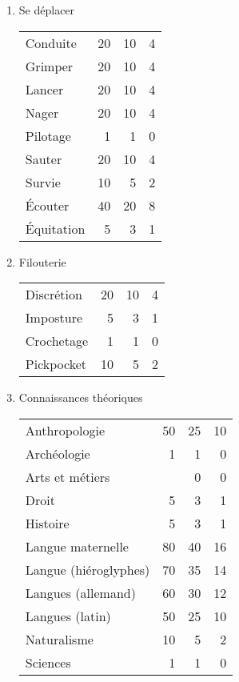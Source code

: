 \documentclass[11pt]{article}
\begin{document}
\begin{twocols}
\begin{enumerate}
\item Se déplacer
\label{sec:org9268a06}

\begin{center}
\begin{tabular}{lrrr}
Conduite & 20 & 10 & 4\\
Grimper & 20 & 10 & 4\\
Lancer & 20 & 10 & 4\\
Nager & 20 & 10 & 4\\
Pilotage & 1 & 1 & 0\\
Sauter & 20 & 10 & 4\\
Survie & 10 & 5 & 2\\
Écouter & 40 & 20 & 8\\
Équitation & 5 & 3 & 1\\
\end{tabular}
\end{center}

\item Filouterie
\label{sec:org83aef7e}

\begin{center}
\begin{tabular}{lrrr}
Discrétion & 20 & 10 & 4\\
Imposture & 5 & 3 & 1\\
Crochetage & 1 & 1 & 0\\
Pickpocket & 10 & 5 & 2\\
\end{tabular}
\end{center}

\item Connaissances théoriques
\label{sec:orgffebf69}

\begin{center}
\begin{tabular}{lrrr}
Anthropologie & 50 & 25 & 10\\
Archéologie & 1 & 1 & 0\\
Arts et métiers &  & 0 & 0\\
Droit & 5 & 3 & 1\\
Histoire & 5 & 3 & 1\\
Langue maternelle & 80 & 40 & 16\\
Langue (hiéroglyphes) & 70 & 35 & 14\\
Langues (allemand) & 60 & 30 & 12\\
Langues (latin) & 50 & 25 & 10\\
Naturalisme & 10 & 5 & 2\\
Sciences & 1 & 1 & 0\\
\end{tabular}
\end{center}


\end{enumerate}
\end{twocols}
\end{document}
